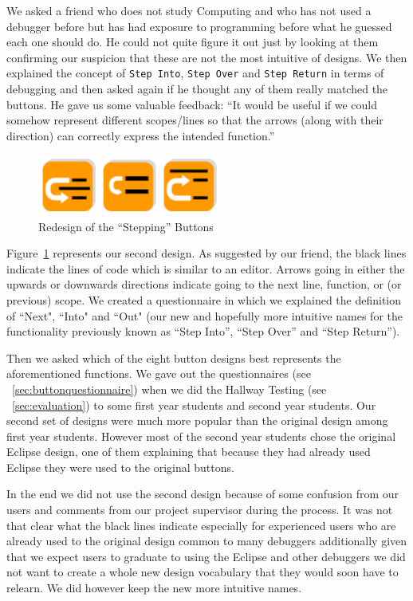 \documentclass[11pt, a4paper]{article}
\newcommand{\cmd}[1]{{\tt #1}}
\begin{document}
We asked a friend who does not study Computing and who has not used a debugger before but has had exposure to programming before what he guessed each one should do.
He could not quite figure it out just by looking at them confirming our suspicion that these are not the most intuitive of designs.
We then explained the concept of \cmd{Step Into}, \cmd{Step Over} and \cmd{Step Return} in terms of debugging and then asked again if he thought any of them really matched the buttons.
He gave us some valuable feedback: ``It would be useful if we could somehow represent different scopes/lines so that the arrows (along with their direction) can correctly express the intended function.''
\begin{figure}[h!]
\centering
\includegraphics[height=20mm,width=60mm]{buttons2.png}
\caption{Redesign of the ``Stepping'' Buttons}
\label{fig:buttons2}
\end{figure}

Figure~\ref{fig:buttons2} represents our second design.
As suggested by our friend, the black lines indicate the lines of code which is similar to an editor.
Arrows going in either the upwards or downwards directions indicate going to the next line, function, or (or previous) scope.
We created a questionnaire in which we explained the definition of ``Next", ``Into" and ``Out" (our new and hopefully more intuitive names for the functionality previously known as ``Step Into'', ``Step Over'' and ``Step Return'').

Then we asked which of the eight button designs best represents the aforementioned functions.
We gave out the questionnaires (see ~\cref{sec:buttonquestionnaire}) when we did the Hallway Testing (see ~\cref{sec:evaluation}) to some first year students and second year students.
Our second set of designs were much more popular than the original design among first year students.
However most of the second year students chose the original Eclipse design, one of them explaining that because they had already used Eclipse they were used to the original buttons.

In the end we did not use the second design because of some confusion from our users and comments from our project supervisor during the process. 
It was not that clear what the black lines indicate especially for experienced users who are already used to the original design common to many debuggers additionally given that we expect users to graduate to using the Eclipse and other debuggers we did not want to create a whole new design vocabulary that they would soon have to relearn. 
We did however keep the new more intuitive names.
\end{document}
